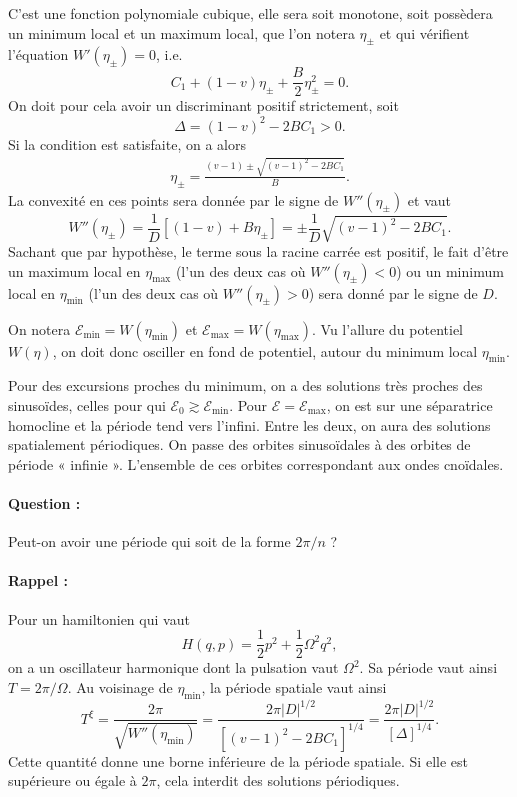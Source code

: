 \documentclass[10pt,a4paper, oneside, fleqn]{myarticle}
\newcommand{\Ecal}{\mathcal{E}}
\begin{document}
C'est une fonction polynomiale cubique, elle sera soit monotone, soit possèdera un minimum local et un maximum local, que l'on notera $\eta_\pm$  et qui vérifient l'équation $W'(\eta_\pm) = 0$, i.e.
\begin{equation}
  C_1 + (1-v) \eta_\pm + \frac{B}{2} \eta_\pm^2 = 0.
\end{equation}
On doit pour cela avoir un discriminant positif strictement, soit
\begin{equation}
  \Delta = (1-v)^2 - 2BC_1 >0.
\end{equation}
Si la condition est satisfaite, on a alors
\begin{gather}
  \eta_\pm = \frac{(v-1)\pm \sqrt{(v-1)^2 - 2BC_1}}{B}.
\end{gather}
La convexité en ces points sera donnée par le signe de $W''(\eta_\pm)$ et vaut
\begin{equation}
  W''(\eta_\pm) = \frac{1}{D}\left[(1-v) + B\eta_\pm\right]=\pm\frac{1}{D}\sqrt{(v-1)^2 - 2BC_1}.
\end{equation}
Sachant que par hypothèse, le terme sous la racine carrée est positif, le fait d'être un maximum local en $\eta_{\max}$ (l'un des deux cas où $W''(\eta_\pm)<0$) ou un minimum local  en $\eta_{\min}$ (l'un des deux cas où $W''(\eta_\pm)>0$) sera donné par le signe de $D$.

On notera $\Ecal_{\min}=W(\eta_{\min})$ et  $\Ecal_{\max}=W(\eta_{\max})$. Vu l'allure du potentiel $W(\eta)$, on doit donc osciller en fond de potentiel, autour du minimum local $\eta_{\min}$.

Pour des excursions proches du minimum, on a des solutions très proches des sinusoïdes, celles pour qui $\Ecal_0\gtrsim \Ecal_{\min}$. Pour $\Ecal = \Ecal_{\max}$, on est sur une séparatrice homocline et la période tend vers l'infini. Entre les deux, on aura des solutions spatialement périodiques. 
On passe des orbites sinusoïdales à des orbites de période « infinie ». L'ensemble de ces orbites correspondant aux ondes cnoïdales.

\paragraph{Question : }Peut-on avoir une période qui soit de la forme $2\pi/n$ ?

\paragraph{Rappel :} Pour un hamiltonien qui vaut
\begin{equation}
  H(q,p) = \frac{1}{2}p^2 + \frac{1}{2}\Omega^2 q^2,
\end{equation}
on a un oscillateur harmonique dont la pulsation vaut $\Omega^2$. Sa période vaut ainsi $T=2\pi/\Omega$. Au voisinage de $\eta_{\min}$, la période spatiale vaut ainsi
\begin{equation}
  T^\xi = \frac{2\pi}{\sqrt{W''(\eta_{\min})}} = \frac{2\pi{|D|^{1/2}}}{\left[(v-1)^2 - 2BC_1\right]^{1/4}}= \frac{2\pi{|D|^{1/2}}}{\left[\Delta\right]^{1/4}}.
\end{equation}
Cette quantité donne une borne inférieure de la période spatiale. Si elle est supérieure ou égale à $2\pi$, cela interdit des solutions périodiques.
\end{document}
